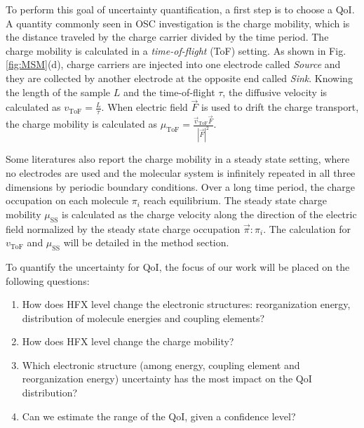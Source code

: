 \documentclass[letterpaper,12pt]{article}
\begin{document}
To perform this goal of uncertainty quantification, a first step is to choose a QoI. A quantity commonly seen in OSC investigation is the charge mobility, which is the distance traveled by the charge carrier divided by the time period. 
The charge mobility is calculated in a \textit{time-of-flight} (ToF) setting. 
As shown in Fig.\ref{fig:MSM}(d), charge carriers are injected into one electrode called \textit{Source} and they are collected by another electrode at the opposite end called \textit{Sink}. 
Knowing the length of the sample $L$ and the time-of-flight $\tau$, the diffusive velocity is calculated as $v_\text{ToF}=\frac{L}{\tau}$.
When electric field $\vec{F}$ is used to drift the charge transport, the charge mobility is calculated as $\mu_\text{ToF}=\frac{\vec{v}_\text{ToF} \vec{F}}{|\vec{F}|^2}$. 

Some literatures also report the charge mobility in a steady state setting, where no electrodes are used and the molecular system is infinitely repeated in all three dimensions by periodic boundary conditions. 
Over a long time period, the charge occupation on each molecule $\pi_i$ reach equilibrium.
The steady state charge mobility $\mu_\text{SS}$ is calculated as the charge velocity along the direction of the electric field normalized by the steady state charge occupation $\vec{\pi}:\pi_i$. 
The calculation for $v_\text{ToF}$ and $\mu_\text{SS}$ will be detailed in the method section.

To quantify the uncertainty for QoI, the focus of our work will be placed on the following questions: 
\begin{enumerate}
    \item How does HFX level change the electronic structures: reorganization energy, distribution of molecule energies and coupling elements? 
    \item How does HFX level change the charge mobility?
    \item Which electronic structure (among energy, coupling element and reorganization energy) uncertainty has the most impact on the QoI distribution?
    \item Can we estimate the range of the QoI, given a confidence level?
\end{enumerate}

\end{document}

